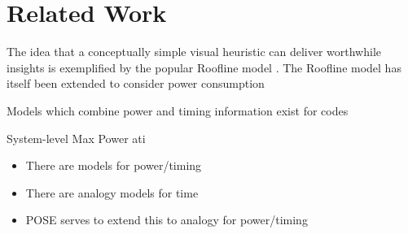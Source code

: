 \section{Related Work}
\label{sec:related}
The idea that a conceptually simple visual heuristic can deliver worthwhile insights is exemplified by the popular Roofline model \cite{williams:2009aa}. The Roofline model has itself been extended to consider power consumption \cite{choi:2013aa} 



Models which combine power and timing information exist for codes 

System-level Max Power ati




\begin{itemize}
  \item There are models for power/timing
  \item There are analogy models for time
  \item POSE serves to extend this to analogy for power/timing
\end{itemize}

%
%




